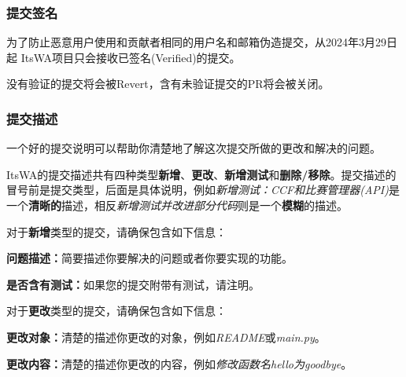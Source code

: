 \documentclass[UTF8]{ctexart}
\newcommand{\itswa}{ItsWA}
\begin{document}
            \subsubsection{提交签名}
                为了防止恶意用户使用和贡献者相同的用户名和邮箱伪造提交，从2024年3月29日起 \itswa 项目只会接收已签名(Verified)的提交。

                没有验证的提交将会被Revert，含有未验证提交的PR将会被关闭。

            \subsubsection{提交描述}
                一个好的提交说明可以帮助你清楚地了解这次提交所做的更改和解决的问题。
                
                \itswa 的提交描述共有四种类型\textbf{新增}、\textbf{更改}、\textbf{新增测试}和\textbf{删除/移除}。提交描述的冒号前是提交类型，后面是具体说明，例如\textit{新增测试：CCF和比赛管理器(API)}是一个\textbf{清晰的}描述，相反\textit{新增测试并改进部分代码}则是一个\textbf{模糊}的描述。

                \vspace{0.1cm}
            
                \noindent 对于\textbf{新增}类型的提交，请确保包含如下信息：

                \begin{compactenum}
                    \item \textbf{问题描述：}简要描述你要解决的问题或者你要实现的功能。
                    \item \textbf{是否含有测试：}如果您的提交附带有测试，请注明。
                \end{compactenum}

                \vspace{0.1cm}

                \noindent 对于\textbf{更改}类型的提交，请确保包含如下信息：

                \begin{compactenum}
                    \item \textbf{更改对象：}清楚的描述你更改的对象，例如\textit{README}或\textit{main.py}。
                    \item \textbf{更改内容：}清楚的描述你更改的内容，例如\textit{修改函数名hello为goodbye}。
                \end{compactenum}

                \vspace{0.1cm}
\end{document}
